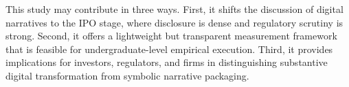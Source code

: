 This study may contribute in three ways. First, it shifts the discussion of digital narratives to the IPO stage, where disclosure is dense and regulatory scrutiny is strong. Second, it offers a lightweight but transparent measurement framework that is feasible for undergraduate-level empirical execution. Third, it provides implications for investors, regulators, and firms in distinguishing substantive digital transformation from symbolic narrative packaging.
